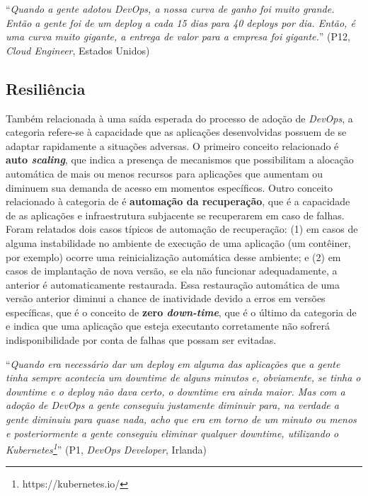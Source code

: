 \begin{mq}
``\emph{Quando a gente adotou DevOps, a nossa curva de ganho foi muito grande.
Então a gente foi de um deploy a cada 15 dias para 40 deploys por dia. Então,
é uma curva muito gigante, a entrega de valor para a empresa foi gigante.}''
(P12, {\it Cloud Engineer}, Estados Unidos)
\end{mq}

\subsection{Resiliência}

Também relacionada à uma saída esperada do processo de adoção de {\it DevOps}, a
categoria  refere-se à capacidade que as aplicações
desenvolvidas possuem de se adaptar rapidamente a situações adversas. O primeiro
conceito relacionado é {\bf auto \emph{scaling}}, que indica a presença de
mecanismos que possibilitam a alocação automática de mais ou menos recursos para
aplicações que aumentam ou diminuem sua demanda de acesso em momentos
específicos. Outro conceito relacionado à categoria de  é
\textbf{automação da recuperação}, que é a capacidade de as aplicações e
infraestrutura subjacente se recuperarem em caso de falhas. Foram relatados dois
casos típicos de automação de recuperação: (1) em casos de alguma instabilidade
no ambiente de execução de uma aplicação (um contêiner, por exemplo) ocorre
uma reinicialização automática desse ambiente; e (2) em casos de implantação
de nova versão, se ela não funcionar adequadamente, a anterior é automaticamente
restaurada. Essa restauração automática de uma versão anterior diminui a chance
de inatividade devido a erros em versões específicas, que é o conceito de {\bf
zero \emph{down-time}}, que é o último da categoria de  e indica
que uma aplicação que esteja executanto corretamente não sofrerá
indisponibilidade por conta de falhas que possam ser evitadas.

\begin{mq}
``\emph{Quando era necessário dar um deploy em alguma das aplicações que a
gente tinha sempre acontecia um downtime de alguns minutos e, obviamente, se
tinha o downtime e o deploy não dava certo, o downtime era ainda maior. Mas com
a adoção de DevOps a gente conseguiu justamente diminuir para, na verdade a
gente diminuiu para quase nada, acho que era em torno de um minuto ou menos e
posteriormente a gente conseguiu eliminar qualquer downtime, utilizando o
Kubernetes\footnote{https://kubernetes.io/}}''
(P1, {\it DevOps Developer}, Irlanda)
\end{mq}

